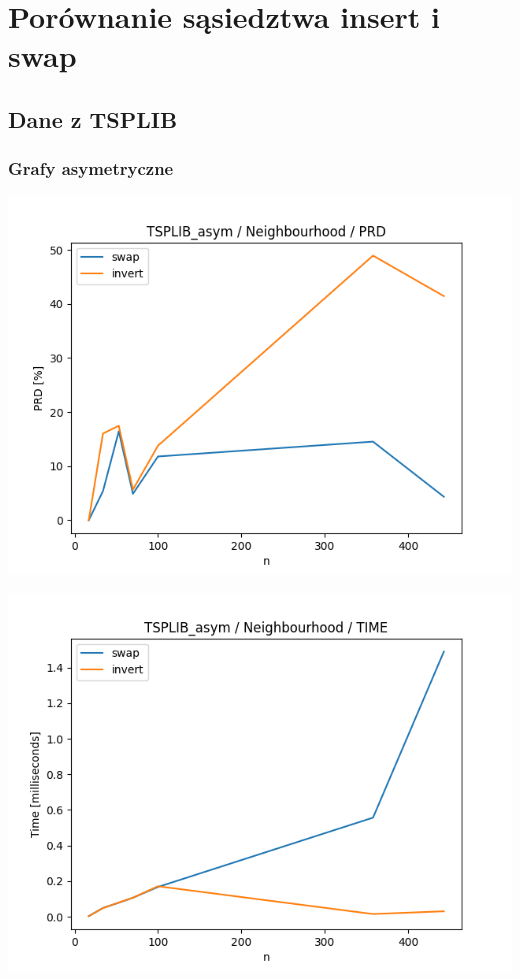 \documentclass{article}
\begin{document}
\section{Porównanie sąsiedztwa insert i swap}

\subsection{Dane z TSPLIB}

\subsubsection{Grafy asymetryczne}

\begin{center}
\includegraphics[width=\textwidth, 
                   height = 0.4\textheight, 
                   keepaspectratio]
                  {plots/neighbours_tsplib_asym_prd} 
\end{center}

\begin{center}
\includegraphics[width=\textwidth, 
                   height = 0.4\textheight, 
                   keepaspectratio]
                  {plots/neighbours_tsplib_asym_time} 
\end{center}
\end{document}
